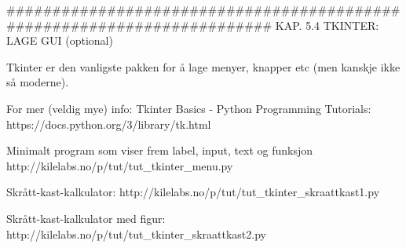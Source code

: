 ######################################################################## 
KAP. 5.4  TKINTER: LAGE GUI  (optional)

Tkinter er den vanligste pakken for å lage menyer, knapper etc 
(men kanskje ikke så moderne). 

For mer (veldig mye) info: 
Tkinter Basics - Python Programming Tutorials:  https://docs.python.org/3/library/tk.html 



Minimalt program som viser frem label, input, text og funksjon
http://kilelabs.no/p/tut/tut_tkinter_menu.py 


Skrått-kast-kalkulator: 
http://kilelabs.no/p/tut/tut_tkinter_skraattkast1.py


Skrått-kast-kalkulator med figur: 
http://kilelabs.no/p/tut/tut_tkinter_skraattkast2.py
